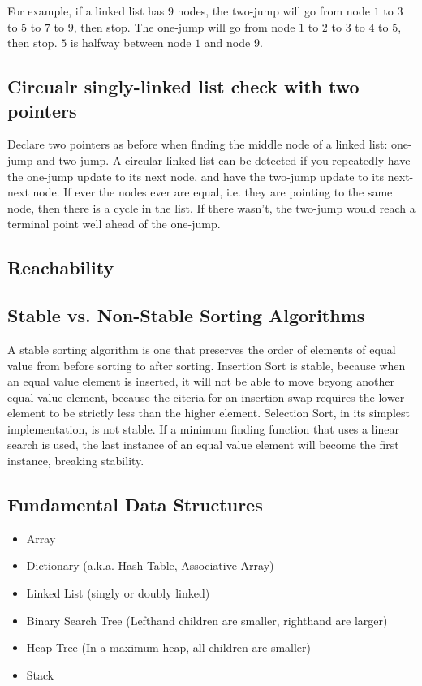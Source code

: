 \documentclass[12pt]{article}
\begin{document}
	For example, if a linked list has $9$ nodes, the two-jump will go from node $1$ to $3$ to $5$ to $7$ to $9$, then stop. The one-jump will go from node $1$ to $2$ to $3$ to $4$ to $5$, then stop. $5$ is halfway between node $1$ and node $9$.

	\subsection{Circualr singly-linked list check with two pointers}
	Declare two pointers as before when finding the middle node of a linked list: one-jump and two-jump. A circular linked list can be detected if you repeatedly have the one-jump update to its next node, and have the two-jump update to its next-next node. If ever the nodes ever are equal, i.e. they are pointing to the same node, then there is a cycle in the list. If there wasn't, the two-jump would reach a terminal point well ahead of the one-jump.

	\subsection{Reachability}

	\subsection{Stable vs. Non-Stable Sorting Algorithms}
	A stable sorting algorithm is one that preserves the order of elements of equal value from before sorting to after sorting. Insertion Sort is stable, because when an equal value element is inserted, it will not be able to move beyong another equal value element, because the citeria for an insertion swap requires the lower element to be strictly less than the higher element. Selection Sort, in its simplest implementation, is not stable. If a minimum finding function that uses a linear search is used, the last instance of an equal value element will become the first instance, breaking stability.

	\subsection{Fundamental Data Structures}
	\begin{itemize}
		\item Array
		\item Dictionary (a.k.a. Hash Table, Associative Array)
		\item Linked List (singly or doubly linked)
		\item Binary Search Tree (Lefthand children are smaller, righthand are larger)
		\item Heap Tree (In a maximum heap, all children are smaller)
		\item Stack
	\end{itemize}
\end{document}

